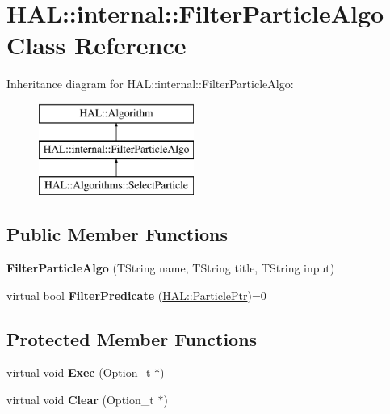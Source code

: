 \hypertarget{class_h_a_l_1_1internal_1_1_filter_particle_algo}{\section{H\-A\-L\-:\-:internal\-:\-:Filter\-Particle\-Algo Class Reference}
\label{class_h_a_l_1_1internal_1_1_filter_particle_algo}
}
Inheritance diagram for H\-A\-L\-:\-:internal\-:\-:Filter\-Particle\-Algo\-:\begin{figure}[H]
\begin{center}
\leavevmode
\includegraphics[height=3.000000cm]{class_h_a_l_1_1internal_1_1_filter_particle_algo}
\end{center}
\end{figure}
\subsection*{Public Member Functions}
\begin{DoxyCompactItemize}
\item 
\hypertarget{class_h_a_l_1_1internal_1_1_filter_particle_algo_ae205ae306b03232d6f8767c028172ade}{{\bfseries Filter\-Particle\-Algo} (T\-String name, T\-String title, T\-String input)}\label{class_h_a_l_1_1internal_1_1_filter_particle_algo_ae205ae306b03232d6f8767c028172ade}

\item 
\hypertarget{class_h_a_l_1_1internal_1_1_filter_particle_algo_a15e167fb7a6538c0a3ff53eccb6a3873}{virtual bool {\bfseries Filter\-Predicate} (\hyperlink{class_h_a_l_1_1_generic_particle}{H\-A\-L\-::\-Particle\-Ptr})=0}\label{class_h_a_l_1_1internal_1_1_filter_particle_algo_a15e167fb7a6538c0a3ff53eccb6a3873}

\end{DoxyCompactItemize}
\subsection*{Protected Member Functions}
\begin{DoxyCompactItemize}
\item 
\hypertarget{class_h_a_l_1_1internal_1_1_filter_particle_algo_a276c8cbf1e29c079b91faeace573cd4f}{virtual void {\bfseries Exec} (Option\-\_\-t $\ast$)}\label{class_h_a_l_1_1internal_1_1_filter_particle_algo_a276c8cbf1e29c079b91faeace573cd4f}

\item 
\hypertarget{class_h_a_l_1_1internal_1_1_filter_particle_algo_abc13ae5f9c270d2e4d5c4b7c36f65f60}{virtual void {\bfseries Clear} (Option\-\_\-t $\ast$)}\label{class_h_a_l_1_1internal_1_1_filter_particle_algo_abc13ae5f9c270d2e4d5c4b7c36f65f60}

\end{DoxyCompactItemize}
